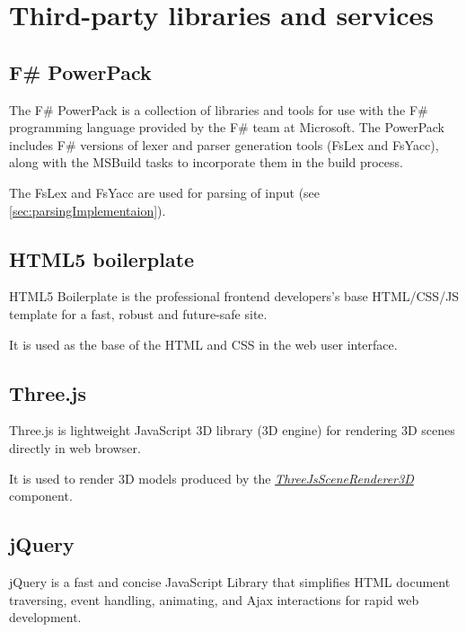 
\chapter{Third-party libraries and services}
\label{chap:thirdParty}

\section{F\# PowerPack}
\label{sec:FSharpPowerPack}

\noindent
The F\# PowerPack is a collection of libraries and tools for use with the F\# programming language provided by the F\# team at Microsoft.
The PowerPack includes F\# versions of lexer and parser generation tools (FsLex and FsYacc), along with the MSBuild tasks to incorporate them in the build process.

The FsLex and FsYacc are used for parsing of input (see \autoref{sec:parsingImplementaion}).


\section{HTML5 boilerplate}
\label{sec:HTML5boilerplate}

\noindent
HTML5 Boilerplate is the professional frontend developers's base HTML/CSS/JS template for a fast, robust and future-safe site.

It is used as the base of the HTML and CSS in the web user interface.


\section{Three.js}
\label{sec:ThreeJs}

\noindent
Three.js is lightweight JavaScript 3D library (3D engine) for rendering 3D scenes directly in web browser.

It is used to render 3D models produced by the \hyperref[Malsys.Processing.Components.Renderers.ThreeJsSceneRenderer3D]{\emph{ThreeJsSceneRenderer3D}} component.


\section{jQuery}
\label{sec:jQuery}

\noindent
jQuery is a fast and concise JavaScript Library that simplifies HTML document traversing, event handling, animating, and Ajax interactions for rapid web development.

